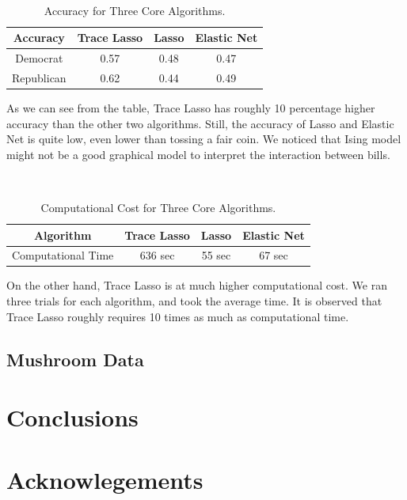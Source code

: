\documentclass[11pt]{article}
\begin{document}
\
\begin{table}[ht]
\centering
\begin{tabular}{c c c c}
\hline
Accuracy & Trace Lasso & Lasso & Elastic Net \\
\hline
Democrat & 0.57 & 0.48 & 0.47 \\
Republican & 0.62 & 0.44 & 0.49 \\
\hline 
\end{tabular}
\caption{Accuracy for Three Core Algorithms.}
\label{table:nonlin} 
\end{table}

As we can see from the table, Trace Lasso has roughly 10 percentage higher accuracy than the other two algorithms. Still, the accuracy of Lasso and Elastic Net is quite low, even lower than tossing a fair coin. We noticed that Ising model might not be a good graphical model to interpret the interaction between bills.


\
\begin{table}[ht]
\centering
\begin{tabular}{c c c c}
\hline
Algorithm & Trace Lasso & Lasso & Elastic Net \\
\hline
Computational Time & 636 sec & 55 sec & 67 sec \\
\hline 
\end{tabular}
\caption{Computational Cost for Three Core Algorithms.}
\label{table:nonlin} 
\end{table}

On the other hand, Trace Lasso is at much higher computational cost. We ran three trials for each algorithm, and took the average time. It is observed that Trace Lasso roughly requires 10 times as much as computational time.

\subsection{Mushroom Data}
\section{Conclusions}
\section{Acknowlegements}


{}

\end{document}
